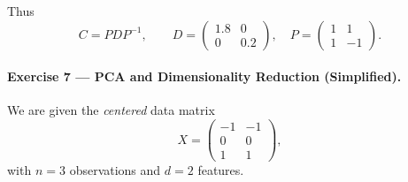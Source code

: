 \documentclass[11pt]{article}
\begin{document}
Thus
\[
C = PDP^{-1},\qquad
D=\begin{pmatrix}1.8 & 0\\ 0 & 0.2\end{pmatrix},\quad
P=\begin{pmatrix}1 & 1\\ 1 & -1\end{pmatrix}.
\]


\bigskip

\paragraph{Exercise 7 --- PCA and Dimensionality Reduction (Simplified).}

We are given the \emph{centered} data matrix
\[
X =
\begin{pmatrix}
-1 & -1 \\
0 & 0 \\
1 & 1
\end{pmatrix},
\]
with $n=3$ observations and $d=2$ features.
\end{document}
